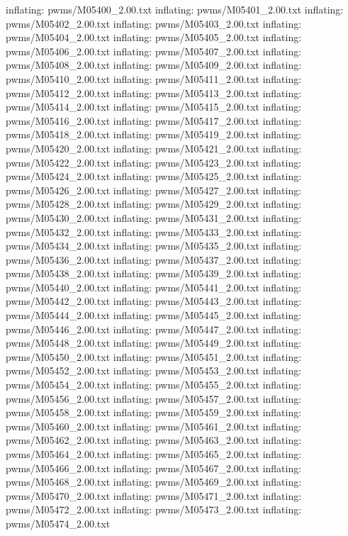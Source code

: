 \documentclass[letterpaper,10pt,english]{sphinxmanual}
\begin{document}
{\begin{sphinxVerbatim}[commandchars=\\\{\}]
  inflating: pwms/M05400\_2.00.txt
  inflating: pwms/M05401\_2.00.txt
  inflating: pwms/M05402\_2.00.txt
  inflating: pwms/M05403\_2.00.txt
  inflating: pwms/M05404\_2.00.txt
  inflating: pwms/M05405\_2.00.txt
  inflating: pwms/M05406\_2.00.txt
  inflating: pwms/M05407\_2.00.txt
  inflating: pwms/M05408\_2.00.txt
  inflating: pwms/M05409\_2.00.txt
  inflating: pwms/M05410\_2.00.txt
  inflating: pwms/M05411\_2.00.txt
  inflating: pwms/M05412\_2.00.txt
  inflating: pwms/M05413\_2.00.txt
  inflating: pwms/M05414\_2.00.txt
  inflating: pwms/M05415\_2.00.txt
  inflating: pwms/M05416\_2.00.txt
  inflating: pwms/M05417\_2.00.txt
  inflating: pwms/M05418\_2.00.txt
  inflating: pwms/M05419\_2.00.txt
  inflating: pwms/M05420\_2.00.txt
  inflating: pwms/M05421\_2.00.txt
  inflating: pwms/M05422\_2.00.txt
  inflating: pwms/M05423\_2.00.txt
  inflating: pwms/M05424\_2.00.txt
  inflating: pwms/M05425\_2.00.txt
  inflating: pwms/M05426\_2.00.txt
  inflating: pwms/M05427\_2.00.txt
  inflating: pwms/M05428\_2.00.txt
  inflating: pwms/M05429\_2.00.txt
  inflating: pwms/M05430\_2.00.txt
  inflating: pwms/M05431\_2.00.txt
  inflating: pwms/M05432\_2.00.txt
  inflating: pwms/M05433\_2.00.txt
  inflating: pwms/M05434\_2.00.txt
  inflating: pwms/M05435\_2.00.txt
  inflating: pwms/M05436\_2.00.txt
  inflating: pwms/M05437\_2.00.txt
  inflating: pwms/M05438\_2.00.txt
  inflating: pwms/M05439\_2.00.txt
  inflating: pwms/M05440\_2.00.txt
  inflating: pwms/M05441\_2.00.txt
  inflating: pwms/M05442\_2.00.txt
  inflating: pwms/M05443\_2.00.txt
  inflating: pwms/M05444\_2.00.txt
  inflating: pwms/M05445\_2.00.txt
  inflating: pwms/M05446\_2.00.txt
  inflating: pwms/M05447\_2.00.txt
  inflating: pwms/M05448\_2.00.txt
  inflating: pwms/M05449\_2.00.txt
  inflating: pwms/M05450\_2.00.txt
  inflating: pwms/M05451\_2.00.txt
  inflating: pwms/M05452\_2.00.txt
  inflating: pwms/M05453\_2.00.txt
  inflating: pwms/M05454\_2.00.txt
  inflating: pwms/M05455\_2.00.txt
  inflating: pwms/M05456\_2.00.txt
  inflating: pwms/M05457\_2.00.txt
  inflating: pwms/M05458\_2.00.txt
  inflating: pwms/M05459\_2.00.txt
  inflating: pwms/M05460\_2.00.txt
  inflating: pwms/M05461\_2.00.txt
  inflating: pwms/M05462\_2.00.txt
  inflating: pwms/M05463\_2.00.txt
  inflating: pwms/M05464\_2.00.txt
  inflating: pwms/M05465\_2.00.txt
  inflating: pwms/M05466\_2.00.txt
  inflating: pwms/M05467\_2.00.txt
  inflating: pwms/M05468\_2.00.txt
  inflating: pwms/M05469\_2.00.txt
  inflating: pwms/M05470\_2.00.txt
  inflating: pwms/M05471\_2.00.txt
  inflating: pwms/M05472\_2.00.txt
  inflating: pwms/M05473\_2.00.txt
  inflating: pwms/M05474\_2.00.txt

\end{sphinxVerbatim}}
\end{document}
